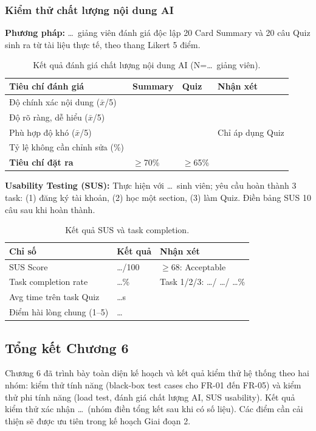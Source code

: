 \subsubsection{Kiểm thử chất lượng nội dung AI}

\textbf{Phương pháp:} \ldots\ giảng viên đánh giá độc lập 20 Card Summary
và 20 câu Quiz sinh ra từ tài liệu thực tế, theo thang Likert 5 điểm.

\begin{table}[H]
    \centering
    \caption{Kết quả đánh giá chất lượng nội dung AI (N=\ldots\ giảng viên).}
    \label{tab:ai-eval}
    \begin{tabular}{p{5.5cm}p{2.5cm}p{2.5cm}p{4cm}}
        \toprule
        \textbf{Tiêu chí đánh giá} & \textbf{Summary} & \textbf{Quiz} &
        \textbf{Nhận xét} \\
        \midrule
        Độ chính xác nội dung ($\bar{x}$/5) & & & \\
        Độ rõ ràng, dễ hiểu ($\bar{x}$/5)  & & & \\
        Phù hợp độ khó ($\bar{x}$/5)       & & & Chỉ áp dụng Quiz \\
        Tỷ lệ không cần chỉnh sửa (\%)     & & & \\
        \midrule
        \textbf{Tiêu chí đặt ra} & $\geq$70\% & $\geq$65\% & \\
        \bottomrule
    \end{tabular}
\end{table}

\textbf{Usability Testing (SUS):}
Thực hiện với \ldots\ sinh viên; yêu cầu hoàn thành 3 task: (1) đăng ký tài
khoản, (2) học một section, (3) làm Quiz. Điền bảng SUS 10 câu sau khi hoàn
thành.

\begin{table}[H]
    \centering
    \caption{Kết quả SUS và task completion.}
    \label{tab:sus}
    \begin{tabular}{p{5cm}p{3cm}p{6.5cm}}
        \toprule
        \textbf{Chỉ số} & \textbf{Kết quả} & \textbf{Nhận xét} \\
        \midrule
        SUS Score                    & \ldots/100 & $\geq$68: Acceptable \\
        Task completion rate         & \ldots\%   & Task 1/2/3: \ldots / \ldots / \ldots\% \\
        Avg time trên task Quiz       & \ldots s   & \\
        Điểm hài lòng chung (1--5)   & \ldots     & \\
        \bottomrule
    \end{tabular}
\end{table}

\subsection{Tổng kết Chương 6}

Chương 6 đã trình bày toàn diện kế hoạch và kết quả kiểm thử hệ thống theo
hai nhóm: kiểm thử tính năng (black-box test cases cho FR-01 đến FR-05) và
kiểm thử phi tính năng (load test, đánh giá chất lượng AI, SUS usability).
Kết quả kiểm thử xác nhận \ldots\ (nhóm điền tổng kết sau khi có số liệu).
Các điểm cần cải thiện sẽ được ưu tiên trong kế hoạch Giai đoạn 2.
